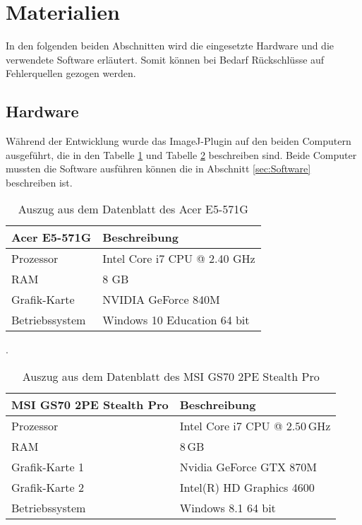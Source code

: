
\section{Materialien}\label{sec:Materials}

In den folgenden beiden Abschnitten wird die eingesetzte Hardware und die verwendete Software erläutert. Somit können bei Bedarf Rückschlüsse auf Fehlerquellen gezogen werden.

\subsection{Hardware}\label{sec:Hardware}

Während der Entwicklung wurde das ImageJ-Plugin auf den beiden Computern ausgeführt, die in den Tabelle \ref{tab:Computer1} und Tabelle \ref{tab:Computer2} beschreiben sind. Beide Computer mussten die Software ausführen können die in Abschnitt \ref{sec:Software} beschreiben ist.

\begin{table}[H]
	\centering
	\begin{tabular}{|l|l|}
		\hline
		\Absatzbox{}
		\textbf{Acer E5-571G}& \textbf{Beschreibung} \\
		\hline
		Prozessor & Intel Core i7 CPU @ 2.40 GHz\\
		\hline
		RAM & 8 GB  \\
		\hline 
		Grafik-Karte & NVIDIA GeForce 840M\\
		\hline
		Betriebssystem &  Windows 10 Education 64 bit   \\
		\hline
	\end{tabular}
	\caption[Auszug aus dem Datenblatt des Acer E5-571G]{Auszug aus dem Datenblatt des Acer E5-571G}.
	\label{tab:Computer1}
\end{table}

\begin{table}[H]
	\centering
	\begin{tabular}{|l|l|}
		\hline
		\Absatzbox{}
		\textbf{MSI GS70 2PE Stealth Pro}& \textbf{Beschreibung} \\
		\hline
		Prozessor & Intel Core i7 CPU @ $2.50\,$GHz \\
		\hline
		RAM & $8\,$GB \\
		\hline 
		Grafik-Karte 1 & Nvidia GeForce GTX 870M\\
		\hline
		Grafik-Karte 2 & Intel(R) HD Graphics 4600\\
		\hline
		Betriebssystem & Windows 8.1 64 bit \\
		\hline
	\end{tabular}
	\caption[Auszug aus dem Datenblatt des MSI GS70 2PE Stealth Pro]{Auszug aus dem Datenblatt des MSI GS70 2PE Stealth Pro}
	\label{tab:Computer2}
\end{table}

